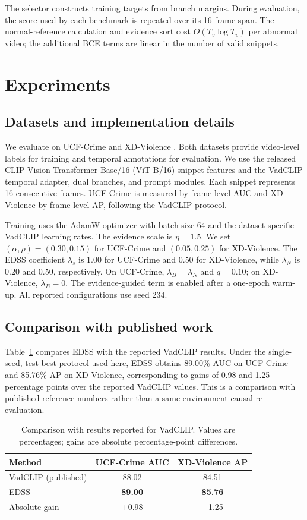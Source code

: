 \documentclass[preprint,12pt]{elsarticle}
\newcommand{\ours}{EDSS}
\begin{document}
The selector constructs training targets from branch margins. During evaluation, the score used by each benchmark is repeated over its 16-frame span. The normal-reference calculation and evidence sort cost $O(T_v\log T_v)$ per abnormal video; the additional BCE terms are linear in the number of valid snippets.

\section{Experiments}
\label{sec:experiments}

\subsection{Datasets and implementation details}
We evaluate on UCF-Crime \citep{sultani2018} and XD-Violence \citep{wu2020multimodal}. Both datasets provide video-level labels for training and temporal annotations for evaluation. We use the released CLIP Vision Transformer-Base/16 (ViT-B/16) snippet features and the VadCLIP temporal adapter, dual branches, and prompt modules. Each snippet represents 16 consecutive frames. UCF-Crime is measured by frame-level AUC and XD-Violence by frame-level AP, following the VadCLIP protocol.

Training uses the AdamW optimizer with batch size 64 and the dataset-specific VadCLIP learning rates. The evidence scale is $\eta=1.5$. We set $(\alpha,\rho)=(0.30,0.15)$ for UCF-Crime and $(0.05,0.25)$ for XD-Violence. The EDSS coefficient $\lambda_s$ is 1.00 for UCF-Crime and 0.50 for XD-Violence, while $\lambda_N$ is 0.20 and 0.50, respectively. On UCF-Crime, $\lambda_B=\lambda_N$ and $q=0.10$; on XD-Violence, $\lambda_B=0$. The evidence-guided term is enabled after a one-epoch warm-up. All reported configurations use seed 234.

\subsection{Comparison with published work}
Table~\ref{tab:main} compares EDSS with the reported VadCLIP results. Under the single-seed, test-best protocol used here, EDSS obtains 89.00\% AUC on UCF-Crime and 85.76\% AP on XD-Violence, corresponding to gains of 0.98 and 1.25 percentage points over the reported VadCLIP values. This is a comparison with published reference numbers rather than a same-environment causal re-evaluation.

\begin{table}[t]
\centering
\caption{Comparison with results reported for VadCLIP. Values are percentages; gains are absolute percentage-point differences.}
\label{tab:main}
\begin{tabular}{lcc}
\toprule
Method & UCF-Crime AUC & XD-Violence AP \\
\midrule
VadCLIP (published) & 88.02 & 84.51 \\
\ours & \textbf{89.00} & \textbf{85.76} \\
Absolute gain & +0.98 & +1.25 \\
\bottomrule
\end{tabular}
\end{table}
\end{document}
